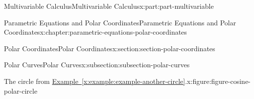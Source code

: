\documentclass[twoside,10pt,]{tufte-book}
\newcommand{\xreffont}{\relax}
\numberwithin{equation}{part}
\begin{document}
\begin{partptx}{Multivariable Calculus}{}{Multivariable Calculus}{}{}{x:part:part-multivariable}
\begin{chapterptx}{Parametric Equations and Polar Coordinates}{}{Parametric Equations and Polar Coordinates}{}{}{x:chapter:parametric-equations-polar-coordinates}
\begin{sectionptx}{Polar Coordinates}{}{Polar Coordinates}{}{}{x:section:section-polar-coordinates}
\begin{subsectionptx}{Polar Curves}{}{Polar Curves}{}{}{x:subsection:subsection-polar-curves}
\begin{figureptx}{The circle from \hyperref[x:example:example-another-circle]{Example~{\xreffont\ref{x:example:example-another-circle}}}.}{x:figure:figure-cosine-polar-circle}{}%
\begin{image}{0}{1}{0}%
\end{image}
\end{figureptx}
\end{subsectionptx}
\end{sectionptx}
\end{chapterptx}
\end{partptx}
\end{document}

